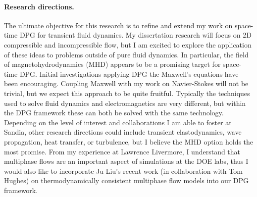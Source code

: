 \documentclass[letterpaper,12pt]{article}
\begin{document}
\paragraph{Research directions.}
The ultimate objective for this research is to refine and extend my work on space-time DPG for transient fluid dynamics.
My dissertation research will focus on 2D compressible and incompressible flow, 
but I am excited to explore the application of these ideas to problems outside of pure fluid dynamics.
In particular, the field of magnetohydrodynamics (MHD) appears to be a promising target for space-time DPG.
Initial investigations applying DPG the Maxwell's equations have been encouraging.
Coupling Maxwell with my work on Navier-Stokes will not be trivial, but we expect this approach to be quite fruitful.
Typically the techniques used to solve fluid dynamics and electromagnetics are very different, but within the DPG framework these can both be solved
with the same technology.
Depending on the level of interest and collaborations I am able to foster at Sandia, 
other research directions could include transient elastodynamics, wave propagation, heat transfer, or turbulence,
but I believe the MHD option holds the most promise.
From my experience at Lawrence Livermore, I understand that multiphase flows are an important aspect of 
simulations at the DOE labs, thus
I would also like to incorporate Ju Liu's recent work (in collaboration with Tom Hughes) on thermodynamically consistent multiphase flow models
into our DPG framework.
\end{document}
